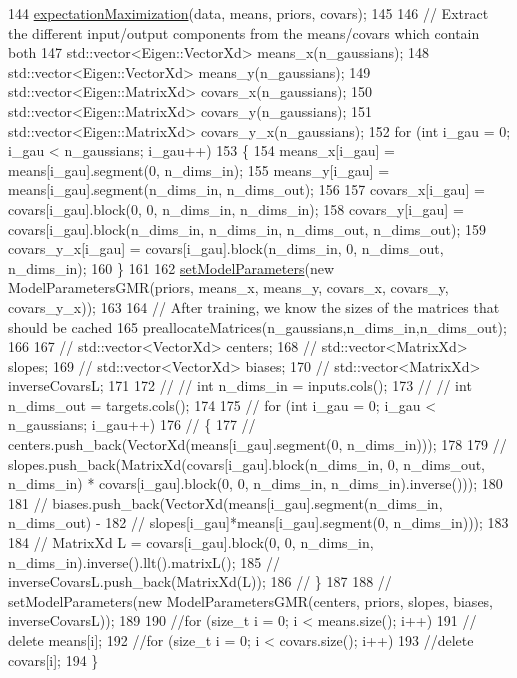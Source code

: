 \begin{DoxyCode}
144   \hyperlink{classDmpBbo_1_1FunctionApproximatorGMR_a78aab3aea2aa82ceadde61d4ca168a64}{expectationMaximization}(data, means, priors, covars);
145 
146   \textcolor{comment}{// Extract the different input/output components from the means/covars which contain both}
147   std::vector<Eigen::VectorXd> means\_x(n\_gaussians);
148   std::vector<Eigen::VectorXd> means\_y(n\_gaussians);
149   std::vector<Eigen::MatrixXd> covars\_x(n\_gaussians);
150   std::vector<Eigen::MatrixXd> covars\_y(n\_gaussians);
151   std::vector<Eigen::MatrixXd> covars\_y\_x(n\_gaussians);
152   \textcolor{keywordflow}{for} (\textcolor{keywordtype}{int} i\_gau = 0; i\_gau < n\_gaussians; i\_gau++)
153   \{
154     means\_x[i\_gau]    = means[i\_gau].segment(0, n\_dims\_in);
155     means\_y[i\_gau]    = means[i\_gau].segment(n\_dims\_in, n\_dims\_out);
156 
157     covars\_x[i\_gau]   = covars[i\_gau].block(0, 0, n\_dims\_in, n\_dims\_in);
158     covars\_y[i\_gau]   = covars[i\_gau].block(n\_dims\_in, n\_dims\_in, n\_dims\_out, n\_dims\_out);
159     covars\_y\_x[i\_gau] = covars[i\_gau].block(n\_dims\_in, 0, n\_dims\_out, n\_dims\_in);
160   \}
161 
162   \hyperlink{classDmpBbo_1_1FunctionApproximator_afd6f9d480456b90c4740c7aaca084ba4}{setModelParameters}(\textcolor{keyword}{new} ModelParametersGMR(priors, means\_x, means\_y, covars\_x, covars\_y,
       covars\_y\_x));
163 
164   \textcolor{comment}{// After training, we know the sizes of the matrices that should be cached}
165   preallocateMatrices(n\_gaussians,n\_dims\_in,n\_dims\_out);
166   
167   \textcolor{comment}{// std::vector<VectorXd> centers;}
168   \textcolor{comment}{// std::vector<MatrixXd> slopes;}
169   \textcolor{comment}{// std::vector<VectorXd> biases;}
170   \textcolor{comment}{// std::vector<MatrixXd> inverseCovarsL;}
171 
172   \textcolor{comment}{// // int n\_dims\_in = inputs.cols();}
173   \textcolor{comment}{// // int n\_dims\_out = targets.cols();}
174 
175   \textcolor{comment}{// for (int i\_gau = 0; i\_gau < n\_gaussians; i\_gau++)}
176   \textcolor{comment}{// \{}
177   \textcolor{comment}{//   centers.push\_back(VectorXd(means[i\_gau].segment(0, n\_dims\_in)));}
178 
179   \textcolor{comment}{//   slopes.push\_back(MatrixXd(covars[i\_gau].block(n\_dims\_in, 0, n\_dims\_out, n\_dims\_in) *
       covars[i\_gau].block(0, 0, n\_dims\_in, n\_dims\_in).inverse()));}
180     
181   \textcolor{comment}{//   biases.push\_back(VectorXd(means[i\_gau].segment(n\_dims\_in, n\_dims\_out) -}
182   \textcolor{comment}{//     slopes[i\_gau]*means[i\_gau].segment(0, n\_dims\_in)));}
183 
184   \textcolor{comment}{//   MatrixXd L = covars[i\_gau].block(0, 0, n\_dims\_in, n\_dims\_in).inverse().llt().matrixL();}
185   \textcolor{comment}{//   inverseCovarsL.push\_back(MatrixXd(L));}
186   \textcolor{comment}{// \}}
187 
188   \textcolor{comment}{// setModelParameters(new ModelParametersGMR(centers, priors, slopes, biases, inverseCovarsL));}
189 
190   \textcolor{comment}{//for (size\_t i = 0; i < means.size(); i++)}
191   \textcolor{comment}{//  delete means[i];}
192   \textcolor{comment}{//for (size\_t i = 0; i < covars.size(); i++)}
193   \textcolor{comment}{//delete covars[i];}
194 \}
\end{DoxyCode}



